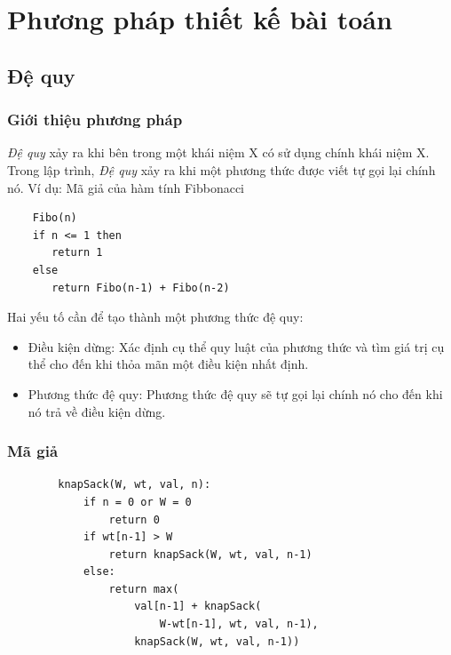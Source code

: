\documentclass[12pt,a4paper]{report}
\begin{document}
    \chapter{Phương pháp thiết kế bài toán}
    \section{Đệ quy}
    \subsection{Giới thiệu phương pháp}
    \textit{Đệ quy} xảy ra khi bên trong một khái niệm X có sử dụng chính khái 
    niệm X. Trong lập trình, \textit{Đệ quy} xảy ra khi một phương thức được viết
    tự gọi lại chính nó.
    Ví dụ: Mã giả của hàm tính Fibbonacci
    \begin{lstlisting}
    Fibo(n)
    if n <= 1 then
       return 1
    else
       return Fibo(n-1) + Fibo(n-2)
    \end{lstlisting}
    Hai yếu tố cần để tạo thành một phương thức đệ quy:
    \begin{itemize}
        \item Điều kiện dừng: Xác định cụ thể quy luật của phương thức và tìm giá 
    trị cụ thể cho đến khi thỏa mãn một điều kiện nhất định.
        \item Phương thức đệ quy: Phương thức đệ quy sẽ tự gọi lại chính nó cho đến khi
    nó trả về điều kiện dừng.
    \end{itemize}

    \subsection{Mã giả}
    \begin{lstlisting}
        knapSack(W, wt, val, n): 
            if n = 0 or W = 0  
                return 0
            if wt[n-1] > W
                return knapSack(W, wt, val, n-1) 
            else: 
                return max( 
                    val[n-1] + knapSack( 
                        W-wt[n-1], wt, val, n-1), 
                    knapSack(W, wt, val, n-1)) 
    \end{lstlisting}
\end{document}

